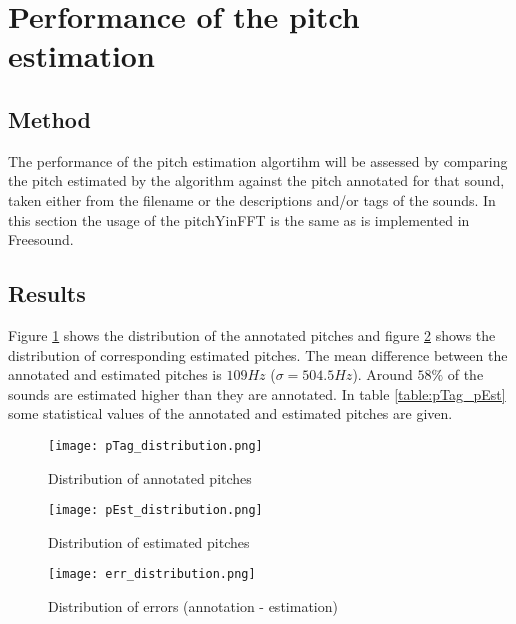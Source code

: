 \documentclass{article}
\begin{document}
\section{Performance of the pitch estimation}
\subsection{Method}
The performance of the pitch estimation algortihm will be assessed by comparing the pitch estimated by the algorithm against the pitch annotated for that sound, taken either from the filename or the descriptions and/or tags of the sounds. In this section the usage of the pitchYinFFT is the same as is implemented in Freesound. 

\subsection{Results}
Figure \ref{fig:pTag_distr} shows the distribution of the annotated pitches and figure \ref{fig:pEst_distr} shows the distribution of corresponding estimated pitches. The mean difference between the annotated and estimated pitches is $109Hz$ ($\sigma = 504.5Hz$). Around $58\%$ of the sounds are estimated higher than they are annotated. In table \ref{table:pTag_pEst} some statistical values of the annotated and estimated pitches are given.

\begin{figure}
    \centering
    \texttt{[image: pTag\_distribution.png]}
    \caption{Distribution of annotated pitches}
    \label{fig:pTag_distr}
\end{figure}
\begin{figure}
    \centering
    \texttt{[image: pEst\_distribution.png]}
    \caption{Distribution of estimated pitches}
    \label{fig:pEst_distr}
\end{figure}
\begin{figure}
    \centering
    \texttt{[image: err\_distribution.png]}
    \caption{Distribution of errors (annotation - estimation)}
    \label{fig:err_distr}
\end{figure}
\end{document}

